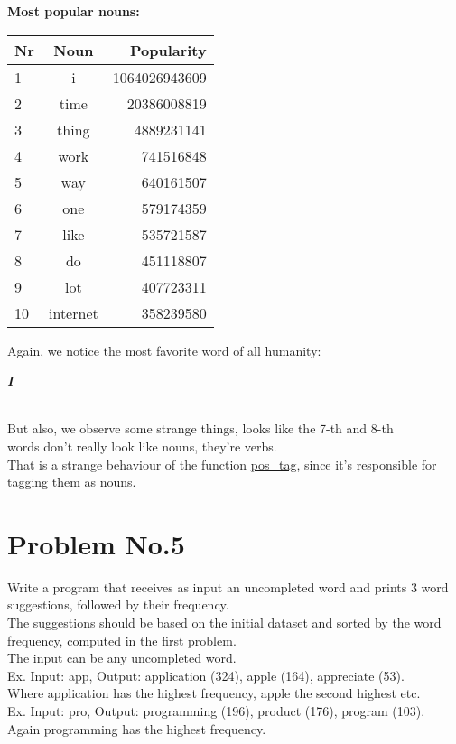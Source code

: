 \documentclass{article}
\begin{document}
      \begin{table}[H]
        \centering
        \textbf{Most popular nouns:}\\
          \begin{tabular}{l|c|r}
            \hline
            Nr & Noun & Popularity \\ \hline
            1 & i & 1064026943609 \\ \hline
            2 & time & 20386008819 \\ \hline
            3 & thing & 4889231141 \\ \hline
            4 & work & 741516848 \\ \hline
            5 & way & 640161507 \\ \hline
            6 & one & 579174359 \\ \hline
            7 & like & 535721587 \\ \hline
            8 & do & 451118807 \\ \hline
            9 & lot & 407723311 \\ \hline
            10 & internet & 358239580 \\
        \end{tabular}
      \end{table}

      Again, we notice the most favorite word of all humanity:\\
      \centerline{\emph{\textbf{I}}}\\
      But also, we observe some strange things, looks like the 7-th and 8-th\\
      words don't really look like nouns, they're verbs.\\
      That is a strange behaviour of the function \underline{pos\_tag},
      since it's responsible for tagging them as nouns.\\

    \newpage


    \section{Problem No.5}
      Write a program that receives as input an uncompleted word and prints 3
      word suggestions, followed by their frequency.\\
      The suggestions should be based on the initial dataset and sorted by the
      word frequency, computed in the first problem.\\
      The input can be any uncompleted word.\\
      Ex. Input: \colorbox{black!10!white}{app}, Output: \colorbox{black!10!white}{application (324), apple (164), appreciate (53).}\\
      Where \colorbox{black!10!white}{application} has the highest frequency, apple the second highest etc.\\
      Ex. Input: \colorbox{black!10!white}{pro}, Output: \colorbox{black!10!white}{programming (196), product (176), program (103).}\\
      Again \colorbox{black!10!white}{programming} has the highest frequency.\\
\end{document}
